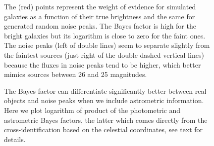 \documentclass[twocolumn]{emulateapj}
\begin{document}
\begin{figure}
\caption{The (red) points represent the weight of evidence for simulated galaxies as a function of their true brightness and the same for generated random noise peaks. The Bayes factor is high for the bright galaxies but its logarithm is close to zero for the faint ones. The noise peaks (left of double lines) seem to separate slightly from the faintest sources (just right of the double dashed vertical lines) because the fluxes in noise peaks tend to be higher, which better mimics sources between 26 and 25 magnitudes.}
\label{fig:bf}
\end{figure}

\begin{figure}
\caption{The Bayes factor can differentiate significantly better between real objects and noise peaks when we include astrometric information. Here we plot logarithm of product of the photometric and astrometric Bayes factors, the latter which comes directly from the cross-identification based on the celestial coordinates, see text for details.}
\label{fig:bf2}
\end{figure}


\iffalse
\end{document}
